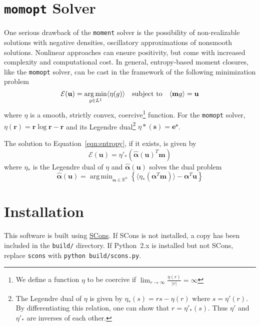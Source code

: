 \documentclass{article}
\newcommand{\R}{\ensuremath{\mathbb{R}}\xspace}
\DeclareMathOperator*{\argmin}{arg\,min}
\newcommand{\integral}[1]{\ensuremath{\langle #1 \rangle}}
\newcommand{\moment}{\texttt{moment}\xspace}
\newcommand{\momopt}{\texttt{momopt}\xspace}
\begin{document}
\section{\momopt Solver}
One serious drawback of the \moment solver is the possibility of non-realizable
solutions with negative densities, oscillatory approximations of nonsmooth
solutions. Nonlinear approaches can ensure positivity,
but come with increased complexity and computational cost. In general,
entropy-based moment closures, like the \momopt solver, can be cast in the
framework of the following minimization problem
\begin{equation}
    \label{eqn:entropy}
    \mathcal{E}(\mathbf{u}) = \argmin_{g \in L^1} \integral{\eta(g)} \quad
    \textnormal{subject to} \quad \integral{\mathbf{m}g} = \mathbf{u}
\end{equation}
where $\eta$ is a smooth, strictly convex, coercive\footnote{We define a
function $\eta$ to be coercive if
$\lim_{r \to \infty} \frac{\eta(r)}{|r|} = \infty$} function. For the
\momopt solver, $\eta(\mathbf{r}) = \mathbf{r} \log \mathbf{r} - \mathbf{r}$
and its Legendre dual\footnote{The Legendre dual of $\eta$ is given by
$\eta_*(s) = rs - \eta(r)$ where $s = \eta'(r)$. By differentiating this
relation, one can show that $r = \eta'_*(s)$. Thus $\eta'$ and $\eta'_*$ are
inverses of each other.} $\eta*(\mathbf{s}) = \mathbf{e^s}$.

The solution to Equation~\ref{eqn:entropy}, if it exists, is given by
\begin{equation}
    \mathcal{E}(\mathbf{u}) = \eta'_*(\hat{\mathbf{\alpha}}(\mathbf{u})^T \mathbf{m})
\end{equation}
where $\eta_*$ is the Legendre dual of $\eta$ and $\hat{\mathbf{\alpha}}(\mathbf{u})$
solves the dual problem
\begin{equation}
    \hat{\mathbf{\alpha}}(\mathbf{u}) = \argmin_{\mathbf{\alpha} \in \R^n}
    \left\{ \integral{\eta_*(\mathbf{\alpha}^T\mathbf{m})} -
    \mathbf{\alpha}^T \mathbf{u} \right\}
\end{equation}


\section{Installation}
This software is built using \href{http://scons.org/}{SCons}. If SCons is not
installed, a copy has been included in the \texttt{build/} directory.
If Python~2.x is installed but not SCons, replace \texttt{scons} with
\texttt{python build/scons.py}.
\end{document}

